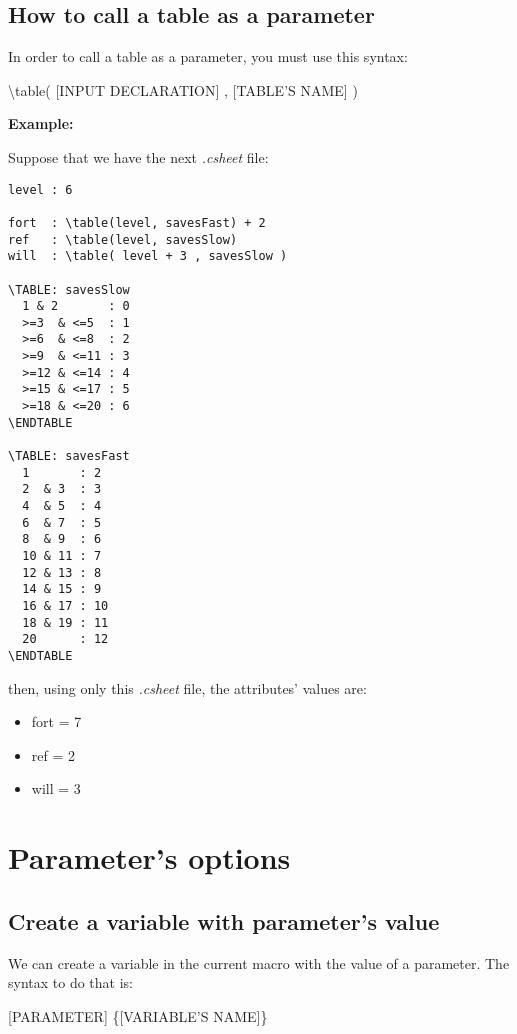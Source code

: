 \documentclass[11pt,a4paper,openright,oneside]{book}
\newenvironment{ex}
{
  \setlength{\parindent}{0cm}
  \large \textbf{Example:} \normalsize 
}
{}
\begin{document}
\subsection{How to call a table as a parameter}

In order to call a table as a parameter, you must use this syntax:

\begin{center} \textsf{\textbackslash table( \textsc{\scriptsize[INPUT DECLARATION]} , \textsc{\scriptsize[TABLE'S NAME]} )} \normalsize \end{center}

\begin{ex}
  Suppose that we have the next \textit{.csheet} file:

\begin{lstlisting}
level : 6

fort  : \table(level, savesFast) + 2
ref   : \table(level, savesSlow)
will  : \table( level + 3 , savesSlow )

\TABLE: savesSlow
  1 & 2       : 0
  >=3  & <=5  : 1
  >=6  & <=8  : 2
  >=9  & <=11 : 3
  >=12 & <=14 : 4
  >=15 & <=17 : 5
  >=18 & <=20 : 6
\ENDTABLE

\TABLE: savesFast
  1       : 2
  2  & 3  : 3
  4  & 5  : 4
  6  & 7  : 5
  8  & 9  : 6
  10 & 11 : 7
  12 & 13 : 8
  14 & 15 : 9
  16 & 17 : 10
  18 & 19 : 11
  20      : 12
\ENDTABLE
  \end{lstlisting}
  then, using only this \textit{.csheet} file, the attributes' values are:
  \begin{itemize}
    \item \textsf{fort = 7}
    \item \textsf{ref  = 2}
    \item \textsf{will = 3}
  \end{itemize}
\end{ex} 

\section{Parameter's options}
\subsection{Create a variable with parameter's value}
We can create a variable in the current macro with the value of a parameter. The syntax to do that is:
\begin{center} \textsf{\textsc{\scriptsize[PARAMETER]} \{\textsc{\scriptsize[VARIABLE'S NAME]}\}} \normalsize \end{center}
\end{document}
